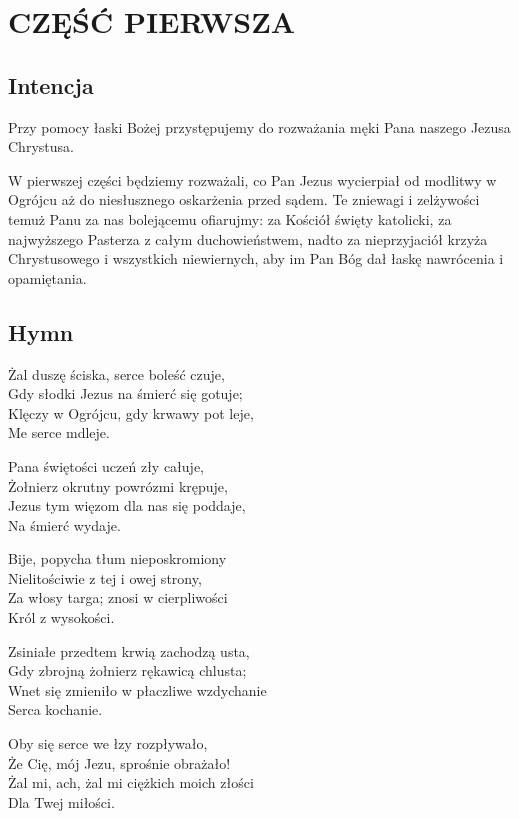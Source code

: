 \section{CZĘŚĆ PIERWSZA}



\subsection{Intencja}

Przy pomocy łaski Bożej przystępujemy do rozważania męki Pana naszego
Jezusa Chrystusa.

W pierwszej części będziemy rozważali, co Pan Jezus wycierpiał od
modlitwy w Ogrójcu aż do niesłusznego oskarżenia przed sądem. Te
zniewagi i zelżywości temuż Panu za nas bolejącemu ofiarujmy: za Kościół
święty katolicki, za najwyższego Pasterza z całym duchowieństwem, nadto
za nieprzyjaciół krzyża Chrystusowego i wszystkich niewiernych, aby im
Pan Bóg dał łaskę nawrócenia i opamiętania.


\subsection{Hymn}

Żal duszę ściska, serce boleść czuje,\\
Gdy słodki Jezus na śmierć się gotuje;\\
Klęczy w Ogrójcu, gdy krwawy pot leje,\\
Me serce mdleje.

Pana świętości uczeń zły całuje,\\
Żołnierz okrutny powrózmi krępuje,\\
Jezus tym więzom dla nas się poddaje,\\
Na śmierć wydaje.

Bije, popycha tłum nieposkromiony\\
Nielitościwie z tej i owej strony,\\
Za włosy targa; znosi w cierpliwości\\
Król z wysokości.

Zsiniałe przedtem krwią zachodzą usta,\\
Gdy zbrojną żołnierz rękawicą chlusta;\\
Wnet się zmieniło w płaczliwe wzdychanie\\
Serca kochanie.

Oby się serce we łzy rozpływało,\\
Że Cię, mój Jezu, sprośnie obrażało!\\
Żal mi, ach, żal mi ciężkich moich złości\\
Dla Twej miłości.


